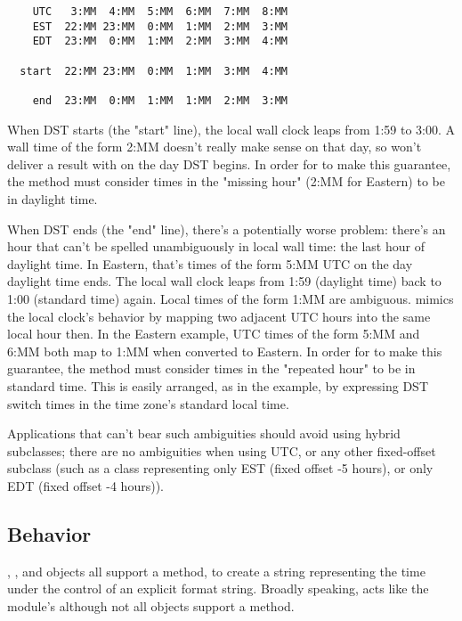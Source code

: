 \begin{verbatim}
    UTC   3:MM  4:MM  5:MM  6:MM  7:MM  8:MM
    EST  22:MM 23:MM  0:MM  1:MM  2:MM  3:MM
    EDT  23:MM  0:MM  1:MM  2:MM  3:MM  4:MM

  start  22:MM 23:MM  0:MM  1:MM  3:MM  4:MM

    end  23:MM  0:MM  1:MM  1:MM  2:MM  3:MM
\end{verbatim}

When DST starts (the "start" line), the local wall clock leaps from 1:59
to 3:00.  A wall time of the form 2:MM doesn't really make sense on that
day, so  won't deliver a result with
 on the
day DST begins.  In order for  to make this
guarantee, the  method must consider times
in the "missing hour" (2:MM for Eastern) to be in daylight time.

When DST ends (the "end" line), there's a potentially worse problem:
there's an hour that can't be spelled unambiguously in local wall time:
the last hour of daylight time.  In Eastern, that's times of
the form 5:MM UTC on the day daylight time ends.  The local wall clock
leaps from 1:59 (daylight time) back to 1:00 (standard time) again.
Local times of the form 1:MM are ambiguous.   mimics
the local clock's behavior by mapping two adjacent UTC hours into the
same local hour then.  In the Eastern example, UTC times of the form
5:MM and 6:MM both map to 1:MM when converted to Eastern.  In order for
 to make this guarantee, the 
method must consider times in the "repeated hour" to be in
standard time.  This is easily arranged, as in the example, by expressing
DST switch times in the time zone's standard local time.

Applications that can't bear such ambiguities should avoid using hybrid
 subclasses; there are no ambiguities when using UTC, or
any other fixed-offset  subclass (such as a class
representing only EST (fixed offset -5 hours), or only EDT (fixed offset
-4 hours)).


\subsection{ Behavior\label{strftime-behavior}}

, , and 
objects all support a 
method, to create a string representing the time under the control of
an explicit format string.  Broadly speaking,
acts like the  module's
although not all objects support a  method.

